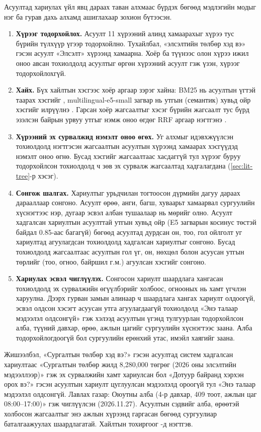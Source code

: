 Асуултад хариулах үйл явц дараах таван алхмаас бүрдэх бөгөөд мэдлэгийн модыг нэг ба гурав дахь алхамд ашиглахаар зохион бүтээсэн.
\begin{enumerate}
    \item \textbf{Хүрээг тодорхойлох.} Асуулт 11 хүрээний алинд хамаарахыг хүрээ тус бүрийн түлхүүр үгээр тодорхойлно. Тухайлбал, «элсэлтийн төлбөр хэд вэ» гэсэн асуулт «Элсэлт» хүрээнд хамаарна. Хоёр ба түүнээс олон хүрээ ижил оноо авсан тохиолдолд асуултыг өргөн хүрээний асуулт гэж үзэн, хүрээг тодорхойлохгүй.
    \item \textbf{Хайх.} Бүх хайлтын хэсгээс хоёр аргаар зэрэг хайна: BM25 нь асуултын үгтэй таарах хэсгийг \cite{robertson2009bm25}, multilingual-e5-small загвар нь утгын (семантик) хувьд ойр хэсгийг илрүүлнэ \cite{wang2024me5}. Гарсан хоёр жагсаалтыг хэсэг бүрийн жагсаалт тус бүрд эзэлсэн байрын урвуу утгыг нэмж оноо өгдөг \acs{RRF} аргаар нэгтгэнэ \cite{cormack2009rrf}.
    \item \textbf{Хүрээний эх сурвалжид нэмэлт оноо өгөх.} Уг алхмыг идэвхжүүлсэн тохиолдолд нэгтгэсэн жагсаалтын асуултын хүрээнд хамаарах хэсгүүдэд нэмэлт оноо өгнө. Бусад хэсгийг жагсаалтаас хасдаггүй тул хүрээг буруу тодорхойлсон тохиолдолд ч зөв эх сурвалж жагсаалтад хадгалагдана (\ref{sec:lit-tree}-р хэсэг).
    \item \textbf{Сонгож шалгах.} Хариултыг урьдчилан тогтоосон дүрмийн дагуу дараах дарааллаар сонгоно. Асуулт өрөө, анги, багш, хуваарьт хамаарвал сургуулийн хүснэгтээс нэр, дугаар эсвэл албан тушаалаар нь мөрийг олно. Асуулт хадгалсан хариултын асуулттай утгын хувьд ойр (E5 загварын косинус төстэй байдал 0.85-аас багагүй) бөгөөд асуултад дурдсан он, тоо, гол ойлголт уг хариултад агуулагдсан тохиолдолд хадгалсан хариултыг сонгоно. Бусад тохиолдолд жагсаалтаас асуултын гол үг, он, нөхцөл болон асуусан утгын төрлийг (тоо, огноо, байршил г.м.) агуулсан хэсгийг сонгоно.
    \item \textbf{Хариулах эсвэл чиглүүлэх.} Сонгосон хариулт шаардлага хангасан тохиолдолд эх сурвалжийн өгүүлбэрийг холбоос, огнооных нь хамт үгчлэн харуулна. Дээрх гурван замын алинаар ч шаардлага хангах хариулт олдоогүй, эсвэл олдсон хэсэгт асуусан утга агуулагдаагүй тохиолдолд «Энэ талаар мэдээлэл олдсонгүй» гэж хэлээд асуултын үгэнд тулгуурлан тодорхойлсон алба, түүний давхар, өрөө, ажлын цагийг сургуулийн хүснэгтээс заана. Алба тодорхойлогдоогүй бол сургуулийн ерөнхий утас, имэйл хаягийг заана.
\end{enumerate}

Жишээлбэл, «Сургалтын төлбөр хэд вэ?» гэсэн асуултад систем хадгалсан хариултаас «Сургалтын төлбөр жилд 8,280,000 төгрөг (2026 оны элсэлтийн мэдээллээр)» гэж эх сурвалжийн хамт хариулсан бол «Дотуур байранд хэрхэн орох вэ?» гэсэн асуултын хариулт цуглуулсан мэдээлэлд ороогүй тул «Энэ талаар мэдээлэл олдсонгүй. Лавлах газар: Оюутны алба (4-р давхар, 409 тоот, ажлын цаг 08:00–17:00)» гэж чиглүүлсэн (2026.11.27). Асуултын сэдвийг алба, өрөөтэй холбосон жагсаалтыг энэ ажлын хүрээнд гаргасан бөгөөд сургуулиар баталгаажуулах шаардлагатай. Хайлтын тохиргоог -д нэгтгэв.

